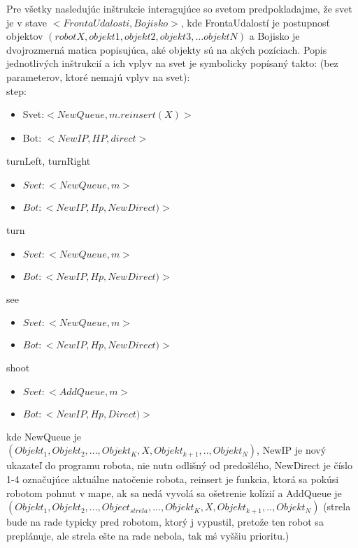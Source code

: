 Pre všetky nasledujúc inštrukcie interagujúce so svetom predpokladajme, že svet je v stave $<FrontaUdalosti, Bojisko>$, kde FrontaUdalostí je postupnosť objektov $(robot X, objekt1, objekt2, objekt3,...objektN)$ a Bojisko je dvojrozmerná matica popisujúca, aké objekty sú na akých pozíciach.
Popis jednotlivých inštrukcií a ich vplyv na svet je symbolicky popísaný takto: (bez parameterov, ktoré nemajú vplyv na svet):\\
\newline
step:\begin {itemize}
\item Svet:$ < NewQueue, m.reinsert(X) > $
\item Bot: $ < NewIP, HP, direct> $
\end {itemize}
turnLeft, turnRight \begin{itemize}
\item $Svet:  <NewQueue, m>$
\item $Bot:  < NewIP, Hp, NewDirect)>$
\end{itemize}
turn  \begin{itemize}
\item $Svet:  < NewQueue, m > $
\item $Bot:   < NewIP, Hp, NewDirect)> $
\end {itemize}
see  \begin{itemize}
\item $Svet:  <NewQueue,m> $
\item $ Bot:  < NewIP, Hp, NewDirect)> $
\end {itemize}
shoot \begin {itemize}
\item $ Svet:  < AddQueue, m> $ 
\item $ Bot:  < NewIP, Hp, Direct)>  $
\end {itemize}
\indent
kde NewQueue je \\ $(Objekt_1, Objekt_2, ..., Objekt_K, X, Objekt_{k+1},.., Objekt_N)$, NewIP je nový ukazateľ do programu robota, nie nutn odlišný od predošlého, NewDirect je číslo 1-4 označujúce aktuálne natočenie robota, reinsert je funkcia, ktorá sa pokúsi robotom pohnut v mape, ak sa nedá vyvolá sa ošetrenie kolízií a AddQueue je\\ $(Objekt_1, Objekt_2, ...,Object_{strela},..., Objekt_K, X, Objekt_{k+1},.., Objekt_N)$ (strela bude na rade typicky pred robotom, ktorý j vypustil, pretože ten robot sa preplánuje, ale strela ešte na rade nebola, tak mś vyššiu prioritu.)
